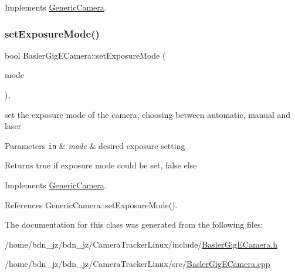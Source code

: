 Implements \hyperlink{classGenericCamera_a62365678e9254bde587de4a50ffb7887}{Generic\+Camera}.

\mbox{\label{classBaslerGigECamera_a228061fb068600be59b4e83c0e8a8e50}} 
\subsubsection{\texorpdfstring{set\+Exposure\+Mode()}{setExposureMode()}}
{\footnotesize\ttfamily bool Basler\+Gig\+E\+Camera\+::set\+Exposure\+Mode (\begin{DoxyParamCaption}\item[{\hyperlink{constants_8h_a6e920987695b1da6e2df4e41dc867e18}{Exposure\+Modes}}]{mode }\end{DoxyParamCaption})\hspace{0.3cm}{\ttfamily [override]}, {\ttfamily [virtual]}}

set the exposure mode of the camera, choosing between automatic, manual and laser 
\begin{DoxyParams}[1]{Parameters}
\mbox{\tt in}  & {\em mode} & desired exposure setting \\
\hline
\end{DoxyParams}
\begin{DoxyReturn}{Returns}
true if exposure mode could be set, false else 
\end{DoxyReturn}


Implements \hyperlink{classGenericCamera_a5c3bd3ca0d691cf9026f8c91b3cf7c66}{Generic\+Camera}.



References Generic\+Camera\+::set\+Exposure\+Mode().



The documentation for this class was generated from the following files\+:\begin{DoxyCompactItemize}
\item 
/home/bdn\+\_\+jz/bdn\+\_\+jz/\+Camera\+Tracker\+Linux/include/\hyperlink{BaslerGigECamera_8h}{Basler\+Gig\+E\+Camera.\+h}\item 
/home/bdn\+\_\+jz/bdn\+\_\+jz/\+Camera\+Tracker\+Linux/src/\hyperlink{BaslerGigECamera_8cpp}{Basler\+Gig\+E\+Camera.\+cpp}\end{DoxyCompactItemize}
